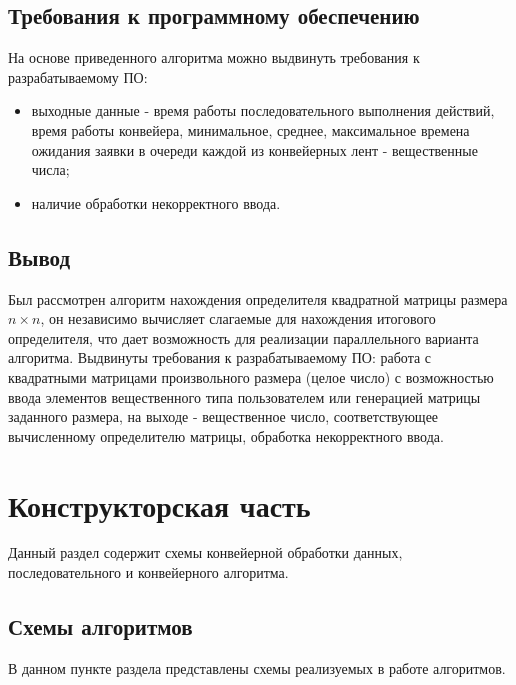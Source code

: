 \documentclass[12pt]{report}
\begin{document}
    \section{Требования к программному обеспечению}
    На основе приведенного алгоритма можно выдвинуть требования к разрабатываемому ПО:
    \begin{itemize}
    	\item выходные данные - время работы последовательного выполнения действий, время работы конвейера, минимальное, среднее, максимальное времена ожидания заявки в очереди каждой из конвейерных лент - вещественные числа;
    	\item наличие обработки некорректного ввода.
    \end{itemize}
    
    \section{Вывод}
    Был рассмотрен алгоритм нахождения определителя квадратной матрицы размера $n \times n$, он независимо вычисляет слагаемые
    для нахождения итогового определителя, что дает возможность для реализации параллельного варианта алгоритма. Выдвинуты требования к разрабатываемому ПО: работа с квадратными матрицами произвольного размера (целое число) с возможностью ввода элементов вещественного типа пользователем или генерацией матрицы заданного размера, на выходе - вещественное число, соответствующее вычисленному определителю матрицы, обработка некорректного ввода.
    \newpage
    
    \chapter{Конструкторская часть}
    Данный раздел содержит схемы конвейерной обработки данных, последовательного и конвейерного алгоритма.
    
    \section{Схемы алгоритмов}
    В данном пункте раздела представлены схемы реализуемых в работе алгоритмов.
    
\end{document}
